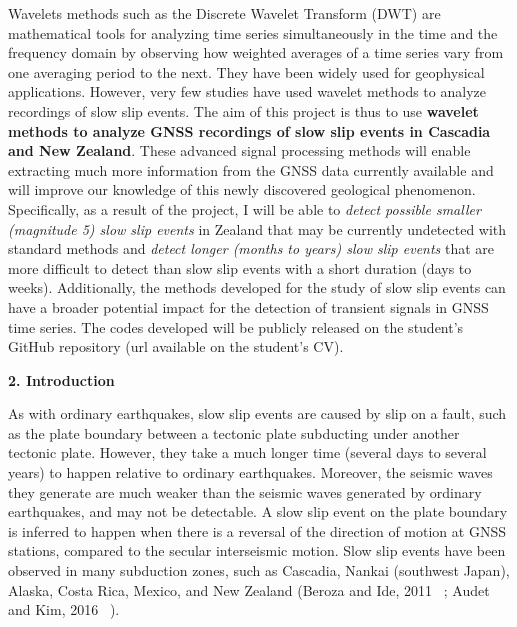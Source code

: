 \documentclass[draft]{agujournal2018}
\begin{document}
Wavelets methods such as the Discrete Wavelet Transform (DWT) are mathematical tools for analyzing time series simultaneously in the time and the frequency domain by observing how weighted averages of a time series vary from one averaging period to the next. They have been widely used for geophysical applications. However, very few studies have used wavelet methods to analyze recordings of slow slip events. The aim of this project is thus to use \textbf{wavelet methods to analyze GNSS recordings of slow slip events in Cascadia  and New Zealand}. These advanced signal processing methods will enable extracting much more information from the GNSS data currently available and will improve our knowledge of this newly discovered geological phenomenon. Specifically, as a result of the project, I will be able to \emph{detect possible smaller (magnitude 5) slow slip events} in Zealand that may be currently undetected with standard methods and \emph{detect longer (months to years) slow slip events} that are more difficult to detect than slow slip events with a short duration (days to weeks). Additionally, the methods developed for the study of slow slip events can have a broader potential impact for the detection of transient signals in GNSS time series. The codes developed will be publicly released on the student's GitHub repository (url available on the student's CV). 

\textbf{2. Introduction}

As with ordinary earthquakes, slow slip events are caused by slip on a fault, such as the plate boundary between a tectonic plate subducting under another tectonic plate. However, they take a much longer time (several days to several years) to happen relative to ordinary earthquakes. Moreover, the seismic waves they generate are much weaker than the seismic waves generated by ordinary earthquakes, and may not be detectable.  A slow slip event on the plate boundary is inferred to happen when there is a reversal of the direction of motion at GNSS stations, compared to the secular interseismic motion. Slow slip events have been observed in many subduction zones, such as Cascadia, Nankai (southwest Japan), Alaska, Costa Rica, Mexico, and New Zealand (Beroza and Ide, 2011 ~\cite{BER_2011}; Audet and Kim, 2016 ~\cite{AUD_2016}).
\end{document}
